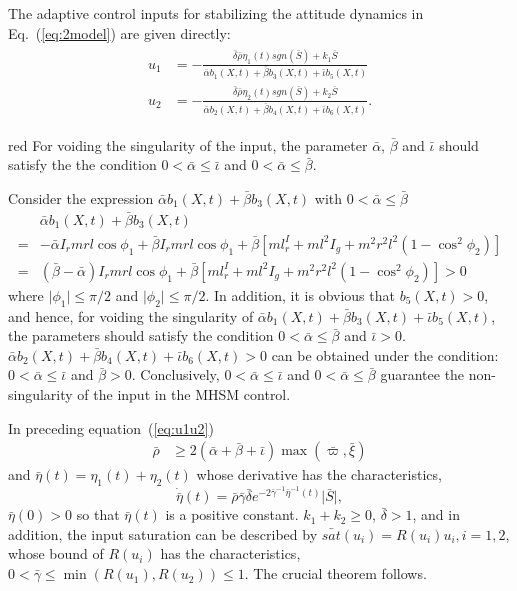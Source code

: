 The adaptive control inputs for stabilizing the attitude dynamics in Eq.~(\ref{eq:2model}) are given directly:
\begin{align}
\begin{split}
u_1 &= -\frac{\bar\delta\bar\rho\eta_1(t)sgn(\bar S)+k_1\bar S}{\bar\alpha b_1(X,t) + \bar\beta b_3(X,t) + \bar\iota b_5(X,t)}\\
u_2 &= -\frac{\bar\delta\bar\rho\eta_2(t)sgn(\bar S)+k_2\bar S}{\bar\alpha b_2(X,t) + \bar\beta b_4(X,t) + \bar\iota b_6(X,t)}.
\end{split}\label{eq:u1u2}
\end{align}\par
\begin{color}{red}
For voiding the singularity of the input, the parameter $\bar\alpha$, $\bar\beta$ and $\bar\iota$ should satisfy the the condition $0<\bar\alpha\le\bar\iota$ and $0<\bar\alpha\le\bar\beta$.\par
    Consider the expression $\bar\alpha b_1(X,t) + \bar\beta b_3(X,t)$ with $0<\bar\alpha\le \bar\beta$
    \begin{align*}
    &\bar\alpha b_1(X,t) + \bar\beta b_3(X,t)\\
    =&-\bar\alpha I_rmrl\cos\phi_1 + \bar\beta I_rmrl\cos\phi_1+\bar\beta[ml^I_r+ml^2I_g+m^2r^2l^2(1-\cos^2\phi_2)]\\
    =&(\bar\beta-\bar\alpha) I_rmrl\cos\phi_1+\bar\beta[ml^I_r+ml^2I_g+m^2r^2l^2(1-\cos^2\phi_2)]>0
    \end{align*}
    where $\vert\phi_1\vert\le\pi/2$ and $\vert\phi_2\vert\le\pi/2$.
    In addition, it is obvious that $b_5(X,t)>0$, and hence, for voiding the singularity of $\bar\alpha b_1(X,t) + \bar\beta b_3(X,t) + \bar\iota b_5(X,t)$,  the parameters should satisfy the condition $0<\bar\alpha\le\bar\beta$ and $\bar\iota>0$. $\bar\alpha b_2(X,t) + \bar\beta b_4(X,t) + \bar\iota b_6(X,t)>0$ can be obtained under the condition: $0<\bar\alpha\le\bar\iota$ and $\bar\beta>0$. Conclusively, $0<\bar\alpha\le\bar\iota$ and $0<\bar\alpha\le\bar\beta$ guarantee the non-singularity of the input in the MHSM control.
\end{color}
In preceding equation~(\ref{eq:u1u2})
\begin{align}
\bar\rho &\ge 2(\bar\alpha + \bar\beta + \bar\iota)\max(\bar\varpi,\bar\xi)
\end{align}
and $\bar\eta(t)=\eta_1(t)+\eta_2(t)$ whose derivative has the characteristics, $$\dot{{\bar\eta}}(t) = \bar\rho\bar\gamma\bar\delta e^{-2\bar\gamma^{-1}{\bar\eta}^{-1}(t)}\vert \bar S\vert,$$ $\bar\eta(0) > 0$ so that $\bar\eta(t)$ is a positive constant. $k_1+k_2\ge 0$, $\bar\delta >1$, and in addition, the input saturation can be described by $\bar{sat}(u_i) = R(u_i)u_i, i =1,2$, whose bound of $R(u_i)$ has the characteristics, $0<\bar\gamma\le \min(R(u_1),R(u_2))\le 1$. The crucial theorem follows.
